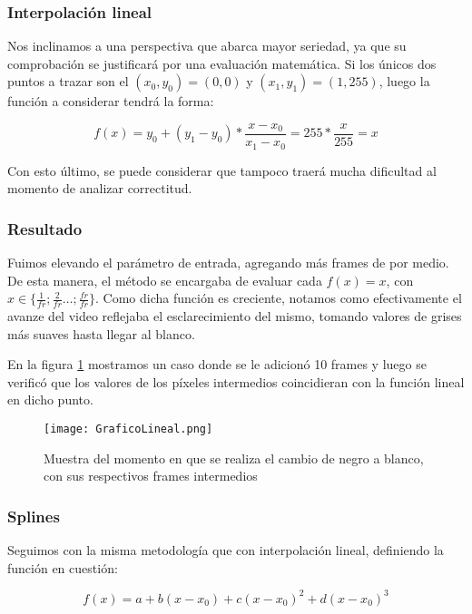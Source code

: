 \subsubsection*{\bf{Interpolaci\'on lineal}}

Nos inclinamos a una perspectiva que abarca mayor seriedad, ya que su comprobaci\'on se justificar\'a por una evaluación matem\'atica. Si los únicos dos puntos a trazar son el $(x_0,y_0) = (0,0)$ y $(x_1,y_1) = (1,255)$, luego la funci\'on a considerar tendr\'a la forma:

$$f(x) = y_0 + (y_1-y_0) * \frac{x - x_0}{x_1 - x_0} = 255 * \frac{x}{255} = x$$

Con esto \'ultimo, se puede considerar que tampoco traer\'a mucha dificultad al momento de analizar correctitud.

\subsubsection*{Resultado}

Fuimos elevando el par\'ametro de entrada, agregando m\'as frames de por medio. De esta manera, el m\'etodo se encargaba de evaluar cada $f(x) = x$, con $x \in \{ \frac{1}{fr} ; \frac{2}{fr} \ldots ; \frac{fr}{fr} \}$. Como dicha funci\'on es creciente, notamos como efectivamente el avanze del video reflejaba el esclarecimiento del mismo, tomando valores de grises m\'as suaves hasta llegar al blanco.

En la figura \ref{fig:linealValidacion} mostramos un caso donde se le adicion\'o 10 frames y luego se verific\'o que los valores de los p\'ixeles intermedios coincidieran con la funci\'on lineal en dicho punto.

\begin{figure}[H]
  \centering
    \texttt{[image: GraficoLineal.png]}
     \caption{Muestra del momento en que se realiza el cambio de negro a blanco, con sus respectivos frames intermedios}\label{fig:linealValidacion}
\end{figure}
\noindent

\subsubsection*{\bf{Splines}}

Seguimos con la misma metodolog\'ia que con interpolaci\'on lineal, definiendo la funci\'on en cuesti\'on:

$$f(x) = a + b (x - x_0) + c (x - x_0)^2 + d (x - x_0)^3$$

